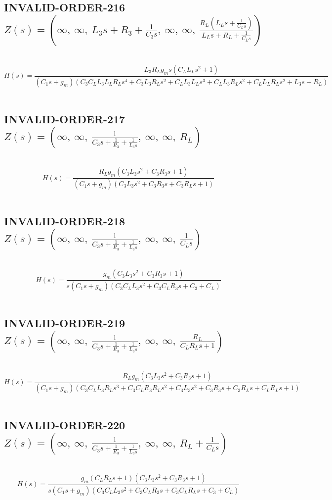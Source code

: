 \documentclass{article}
\begin{document}
\subsection{INVALID-ORDER-216 $Z(s) = \left( \infty, \  \infty, \  L_{3} s + R_{3} + \frac{1}{C_{3} s}, \  \infty, \  \infty, \  \frac{R_{L} \left(L_{L} s + \frac{1}{C_{L} s}\right)}{L_{L} s + R_{L} + \frac{1}{C_{L} s}}\right)$ } \ 
\textbf{\[H(s) = \frac{L_{3} R_{L} g_{m} s \left(C_{L} L_{L} s^{2} + 1\right)}{\left(C_{1} s + g_{m}\right) \left(C_{3} C_{L} L_{3} L_{L} R_{L} s^{4} + C_{3} L_{3} R_{L} s^{2} + C_{L} L_{3} L_{L} s^{3} + C_{L} L_{3} R_{L} s^{2} + C_{L} L_{L} R_{L} s^{2} + L_{3} s + R_{L}\right)}\] } \ 
\subsection{INVALID-ORDER-217 $Z(s) = \left( \infty, \  \infty, \  \frac{1}{C_{3} s + \frac{1}{R_{3}} + \frac{1}{L_{3} s}}, \  \infty, \  \infty, \  R_{L}\right)$ } \ 
\textbf{\[H(s) = \frac{R_{L} g_{m} \left(C_{3} L_{3} s^{2} + C_{3} R_{3} s + 1\right)}{\left(C_{1} s + g_{m}\right) \left(C_{3} L_{3} s^{2} + C_{3} R_{3} s + C_{3} R_{L} s + 1\right)}\] } \ 
\subsection{INVALID-ORDER-218 $Z(s) = \left( \infty, \  \infty, \  \frac{1}{C_{3} s + \frac{1}{R_{3}} + \frac{1}{L_{3} s}}, \  \infty, \  \infty, \  \frac{1}{C_{L} s}\right)$ } \ 
\textbf{\[H(s) = \frac{g_{m} \left(C_{3} L_{3} s^{2} + C_{3} R_{3} s + 1\right)}{s \left(C_{1} s + g_{m}\right) \left(C_{3} C_{L} L_{3} s^{2} + C_{3} C_{L} R_{3} s + C_{3} + C_{L}\right)}\] } \ 
\subsection{INVALID-ORDER-219 $Z(s) = \left( \infty, \  \infty, \  \frac{1}{C_{3} s + \frac{1}{R_{3}} + \frac{1}{L_{3} s}}, \  \infty, \  \infty, \  \frac{R_{L}}{C_{L} R_{L} s + 1}\right)$ } \ 
\textbf{\[H(s) = \frac{R_{L} g_{m} \left(C_{3} L_{3} s^{2} + C_{3} R_{3} s + 1\right)}{\left(C_{1} s + g_{m}\right) \left(C_{3} C_{L} L_{3} R_{L} s^{3} + C_{3} C_{L} R_{3} R_{L} s^{2} + C_{3} L_{3} s^{2} + C_{3} R_{3} s + C_{3} R_{L} s + C_{L} R_{L} s + 1\right)}\] } \ 
\subsection{INVALID-ORDER-220 $Z(s) = \left( \infty, \  \infty, \  \frac{1}{C_{3} s + \frac{1}{R_{3}} + \frac{1}{L_{3} s}}, \  \infty, \  \infty, \  R_{L} + \frac{1}{C_{L} s}\right)$ } \ 
\textbf{\[H(s) = \frac{g_{m} \left(C_{L} R_{L} s + 1\right) \left(C_{3} L_{3} s^{2} + C_{3} R_{3} s + 1\right)}{s \left(C_{1} s + g_{m}\right) \left(C_{3} C_{L} L_{3} s^{2} + C_{3} C_{L} R_{3} s + C_{3} C_{L} R_{L} s + C_{3} + C_{L}\right)}\] } \ 
\end{document}
